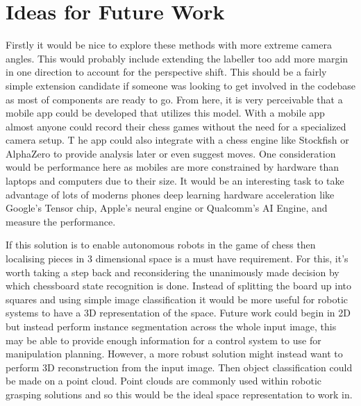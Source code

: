 \section{Ideas for Future Work}
Firstly it would be nice to explore these methods with more extreme camera angles.  This would probably include extending the labeller too add more 
margin in one direction to account for the perspective shift.  This should be a fairly simple extension candidate if someone was looking to 
get involved in the codebase as most of components are ready to go.  From here, it is very perceivable that a mobile app could be developed that utilizes this model. 
With a mobile app almost anyone could record their chess games without the need for a specialized camera setup.  T
he app could also integrate with a chess engine like Stockfish or AlphaZero to provide analysis later or even suggest moves.  
One consideration would be performance here as mobiles are more constrained by hardware than laptops and computers due to their size.  
It would be an interesting task to take advantage of lots of moderns phones deep learning hardware acceleration like Google's Tensor chip, 
Apple's neural engine or Qualcomm's AI Engine, and measure the performance.

If this solution is to enable autonomous robots in the game of chess then localising pieces in 3 dimensional space is a must have requirement.
For this, it's worth taking a step back and reconsidering the unanimously made decision by which chessboard state recognition is done.  Instead of splitting 
the board up into squares and using simple image classification it would be more useful for robotic systems to have a 3D representation of the space.
Future work could begin in 2D but instead perform instance segmentation across the whole input image, this may be able to provide enough information for a 
control system to use for manipulation planning.  However, a more robust solution might instead want to perform 3D reconstruction from the input image.  
Then object classification could be made on a point cloud.  Point clouds are commonly used within robotic grasping solutions \cite{bicchi2000robotic} and so this would be the ideal 
space representation to work in.
